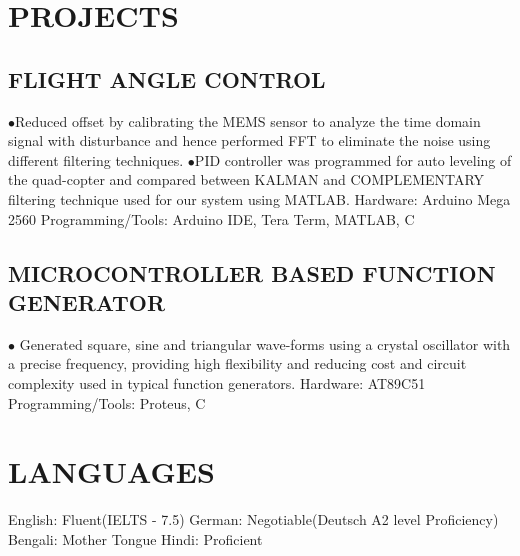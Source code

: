 \documentclass{article}
\begin{document}
\begin{minipage}[t]{0.58\textwidth}
\section{PROJECTS}
\subsection{FLIGHT ANGLE CONTROL}
$\bullet$Reduced offset by calibrating the MEMS sensor to analyze the time domain signal with disturbance and hence performed FFT to eliminate the noise using different filtering techniques.\newline
$\bullet$PID controller was programmed for auto leveling of the quad-copter and compared between KALMAN and COMPLEMENTARY filtering technique used for our system using MATLAB.\newline
{Hardware}: Arduino Mega 2560\newline
{Programming/Tools}: Arduino IDE, Tera Term, MATLAB, C
\vspace{0.1cm}
\subsection{MICROCONTROLLER BASED FUNCTION GENERATOR}
$\bullet$ Generated square, sine and triangular wave-forms using a crystal oscillator with a precise frequency, providing high flexibility and reducing cost and circuit complexity used in typical function generators. \newline
{Hardware}: AT89C51\newline
{Programming/Tools}: Proteus, C
\vspace{0.3cm}
\section{LANGUAGES}
English:    Fluent(IELTS - 7.5)\newline
German:  Negotiable(Deutsch A2 level Proficiency)\newline
Bengali:   Mother Tongue\newline
Hindi:      Proficient   
\end{minipage}
\end{document}
